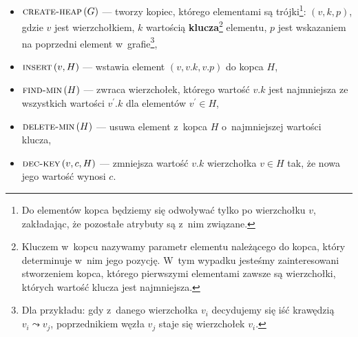 \begin{itemize}
	\item $\textsc{create-heap} \left( G \right)$ --- tworzy kopiec, którego elementami są trójki\footnote{
		Do elementów kopca będziemy się odwoływać tylko po wierzchołku $v$, zakładając, że pozostałe atrybuty są z~nim związane.
	}: $\left( v, k, p \right)$, gdzie $v$ jest wierzchołkiem, $k$ wartością \textbf{klucza}\footnote{
		Kluczem w~kopcu nazywamy parametr elementu należącego do kopca, który determinuje w~nim jego pozycję.
		W~tym wypadku jesteśmy zainteresowani stworzeniem kopca, którego pierwszymi elementami zawsze są wierzchołki, których wartość klucza jest najmniejsza.
	} elementu, $p$ jest wskazaniem na poprzedni element w~grafie\footnote{
		Dla przykładu: gdy z~danego wierzchołka $v_{i}$ decydujemy się iść krawędzią $v_{i} \leadsto v_{j}$, poprzednikiem węzła $v_{j}$ staje się wierzchołek $v_{i}$.
	},
	\item $\textsc{insert} \left( v, H \right)$ --- wstawia element $\left( v, v.k, v.p \right)$ do kopca $H$,
	\item $\textsc{find-min} \left( H \right)$ --- zwraca wierzchołek, którego wartość $v.k$ jest najmniejsza ze wszystkich wartości $v^{\prime}.k$ dla elementów $v^{\prime} \in H$,
	\item $\textsc{delete-min} \left( H \right)$ --- usuwa element z~kopca $H$ o~najmniejszej wartości klucza,
	\item $\textsc{dec-key} \left( v, c, H \right)$ --- zmniejsza wartość $v.k$ wierzchołka $v \in H$ tak, że nowa jego wartość wynosi $c$.
\end{itemize}

